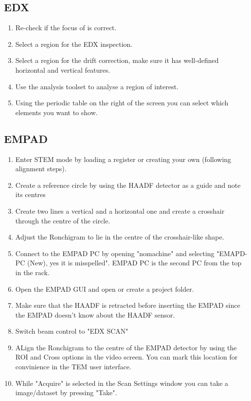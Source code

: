\documentclass[a4paper]{scrartcl}
\begin{document}
\subsection*{EDX}
\begin{enumerate}
    \item Re-check if the focus of is correct.
    \item Select a region for the EDX inspection.
    \item Select a region for the drift correction, make sure it has well-defined horizontal and vertical features.
    \item Use the analysis toolset to analyse a region of interest.
    \item Using the periodic table on the right of the screen you can select which elements you want to show.
\end{enumerate}

\subsection*{EMPAD}
\begin{enumerate}
    \item Enter STEM mode by loading a register or creating your own (following alignment steps).
    \item Create a reference circle by using the HAADF detector as a guide and note its centres
    \item Create two lines a vertical and a horizontal one and create a crosshair through the centre of the circle.
    \item Adjust the Ronchigram to lie in the centre of the crosshair-like shape.
    \item Connect to the EMPAD PC by opening "nomachine" and selecting "EMAPD-PC (New), yes it is misspelled". EMPAD PC is the second PC from the top in the rack.
    \item Open the EMPAD GUI and open or create a project folder.
    \item Make sure that the HAADF is retracted before inserting the EMPAD since the EMPAD doesn't know about the HAADF sensor.
    \item Switch beam control to "EDX SCAN"
    \item ALign the Ronchigram to the centre of the EMPAD detector by using the ROI and Cross options in the video screen. You can mark this location for convinience in the TEM user interface.
    \item While "Acquire" is selected in the Scan Settings window you can take a image/dataset by pressing "Take".
\end{enumerate}
\end{document}
